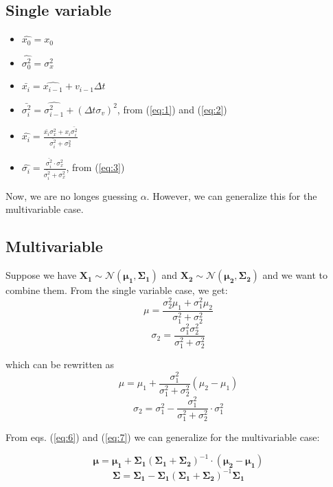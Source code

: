 \documentclass{article}
\begin{document}
\subsection{Single variable}
\begin{itemize}
    \item $\hat{x_0} = x_0$
    \item $\hat{\sigma_0^2} = \sigma_x^2$
    \item $\bar{x_i} = \hat{x_{i-1}}+v_{i-1}\Delta t$
    \item $\bar{\sigma_i^2} = \hat{\sigma_{i-1}^2}+(\Delta t\sigma_v)^2$, from (\ref{eq:1}) and (\ref{eq:2})
    \item $\hat{x_i} = \frac{\bar{x_i}\sigma_x^2 + x_i\bar{\sigma_i^2}}{\bar{\sigma_i^2} + \sigma_x^2}$
    \item $\hat{\sigma_i} = \frac{\bar{\sigma_i^2}\cdot\sigma_x^2}{\bar{\sigma_i^2} + \sigma_x^2}$, from (\ref{eq:3})
\end{itemize}
\newpage
Now, we are no longes guessing $\alpha$. However, we can generalize this for the multivariable case.
\subsection{Multivariable} 
Suppose we have $\bm{X_1} \sim \mathcal{N}(\bm{\mu_1}, \bm{\Sigma_1})$ and $\bm{X_2} \sim \mathcal{N}(\bm{\mu_2}, \bm{\Sigma_2})$ and we want to combine them. From the single variable case, we get:
\begin{equation} \label{eq:4}
    \mu = \frac{\sigma_2^2\mu_1 + \sigma_1^2\mu_2}{\sigma_1^2 + \sigma_2^2}
\end{equation}
\begin{equation} \label{eq:5}
    \sigma_2 = \frac{\sigma_1^2\sigma_2^2}{\sigma_1^2 + \sigma_2^2}
\end{equation}

which can be rewritten as
\begin{equation} \label{eq:6}
    \mu = \mu_1 + \frac{\sigma_1^2}{\sigma_1^2 + \sigma_2^2}(\mu_2 - \mu_1)
\end{equation}
\begin{equation} \label{eq:7}
    \sigma_2 = \sigma_1^2 - \frac{\sigma_1^2}{\sigma_1^2 + \sigma_2^2}\cdot\sigma_1^2
\end{equation}

From eqs. (\ref{eq:6}) and (\ref{eq:7}) we can generalize for the multivariable case:

\begin{equation}
    \bm{\mu} = \bm{\mu_1} + \bm{\Sigma_1}(\bm{\Sigma_1} + \bm{\Sigma_2})^{-1} \cdot (\bm{\mu_2} - \bm{\mu_1})
\end{equation}
\begin{equation}
    \bm{\Sigma} = \bm{\Sigma_1} - \bm{\Sigma_1}(\bm{\Sigma_1} + \bm{\Sigma_2})^{-1}\bm{\Sigma_1}
\end{equation}
\end{document}

